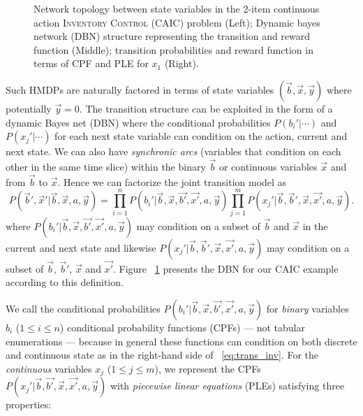 \documentclass[twoside,11pt]{article}
\newcommand{\InventoryControl}{\textsc{Inventory Control }}
\begin{document}
\begin{figure}[t!]
\begin{subfigure}
        \end{subfigure}
        \vspace{-3mm}
\caption{\footnotesize Network topology between state variables in the 2-item continuous action \InventoryControl (CAIC) problem (Left); Dynamic bayes network (DBN) structure representing the transition and reward function (Middle); transition probabilities and reward function in terms of CPF and PLE for $x_1$ (Right). }
\label{fig:dbn}
\vspace{-3mm}
\end{figure}

Such HMDPs are naturally factored \cite{boutilier99dt}
in terms of state variables $(\vec{b},\vec{x},\vec{y})$ where potentially $\vec{y} =0$. The transition structure can be exploited in the form of a dynamic Bayes
net (DBN) \cite{dbn} where the conditional probabilities
$P(b_i'|\cdots)$ and $P(x_j'|\cdots)$ for each next state variable can
condition on the action, current and next state. 
We can also have \emph{synchronic arcs} (variables that condition on each
other in the same time slice) within the binary $\vec{b}$ or
continuous variables $\vec{x}$ and from $\vec{b}$ to $\vec{x}$.%
Hence we can factorize the joint transition model as
{%
\begin{equation}
P(\vec{b}',\vec{x}'|\vec{b},\vec{x},a,\vec{y}) = 
\prod_{i=1}^n P(b_i'|\vec{b},\vec{x},\vec{b'},\vec{x'},a,\vec{y}) \prod_{j=1}^m P(x_j'|\vec{b},\vec{b}',\vec{x},\vec{x'},a,\vec{y}). \nonumber %
\end{equation}}
where $P(b_i'|\vec{b},\vec{x},\vec{b'},\vec{x'},a,\vec{y})$ may condition on a subset of
$\vec{b}$ and $\vec{x}$ in the current and next state and likewise 
$P(x_j'|\vec{b},\vec{b}',\vec{x},\vec{x'},a,\vec{y})$ may condition on a subset of
$\vec{b}$, $\vec{b}'$, $\vec{x}$ and $\vec{x'}$. Figure ~\ref{fig:dbn} presents the DBN for our CAIC example according to this definition.  

We call the conditional probabilities
$P(b_i'|\vec{b},\vec{x},\vec{b'},\vec{x'},a,\vec{y})$ for \emph{binary} variables $b_i$
($1 \leq i \leq n$) conditional probability functions (CPFs) --- not
tabular enumerations --- because in general these functions can
condition on both discrete and continuous state as
in the right-hand side of ~\eqref{eq:trans_inv}.  For the \emph{continuous} variables
$x_j$ ($1 \leq j \leq m$), we represent the CPFs
$P(x_j'|\vec{b},\vec{b'},\vec{x},\vec{x'},a,\vec{y})$ with \emph{piecewise
linear equations} (PLEs) satisfying three properties: 
\end{document}
